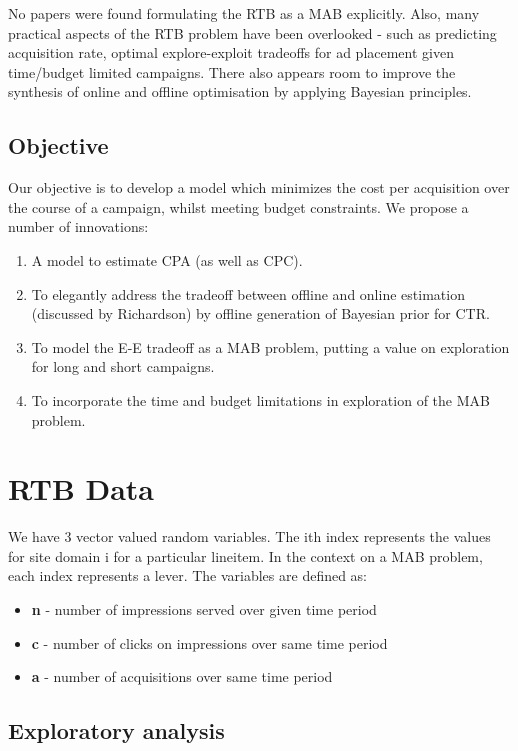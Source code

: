 \documentclass[11pt,a4,singlespacing,titlepagenumber=on]{scrreprt}
\numberwithin{equation}{chapter} %
\theoremstyle{remark}
\begin{document}
No papers were found formulating the RTB as a MAB explicitly. Also, many practical aspects of the RTB problem have been overlooked - such as predicting acquisition rate, optimal explore-exploit tradeoffs for ad placement given time/budget limited campaigns. There also appears room to improve the synthesis of online and offline optimisation by applying Bayesian principles.

\section{Objective}
Our objective is to develop a model which minimizes the cost per acquisition over the course of a campaign, whilst meeting budget constraints. We propose a number of innovations:
\begin{enumerate}
	\item A model to estimate CPA (as well as CPC).
	\item To elegantly address the tradeoff between offline and online estimation (discussed by Richardson) by offline generation of Bayesian prior for CTR.
	\item To model the E-E tradeoff as a MAB problem, putting a value on exploration for long and short campaigns.
	\item To incorporate the time and budget limitations in exploration of the MAB problem.
\end{enumerate}


\chapter{RTB Data}

We have 3 vector valued random variables. The ith index represents the values for site domain i for a particular lineitem. In the context on a MAB problem, each index represents a lever. The variables are defined as:
\begin{itemize}
	\item \textbf{n} - number of impressions served over given time period
	\item \textbf{c} - number of clicks on impressions over same time period 
	\item \textbf{a} - number of acquisitions over same time period
\end{itemize}

\section{Exploratory analysis}
\end{document}
